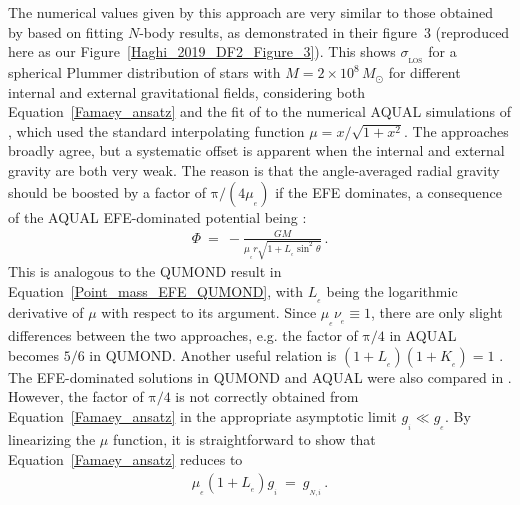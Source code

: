 \documentclass[fleqn,usenatbib,useAMS]{mnras} %
\begin{document}
The numerical values given by this approach are very similar to those obtained by \citet{Haghi_2019_DF2} based on fitting $N$-body results, as demonstrated in their figure~3 (reproduced here as our Figure~\ref{Haghi_2019_DF2_Figure_3}). This shows $\sigma_{_\text{LOS}}$ for a spherical Plummer distribution of stars with $M = 2 \times 10^8 \, M_\odot$ for different internal and external gravitational fields, considering both Equation~\ref{Famaey_ansatz} and the fit of \citet{Haghi_2019_DF2} to the numerical AQUAL simulations of \citet{Haghi_2009}, which used the standard interpolating function $\mu = x/\sqrt{1 + x^2}$. The approaches broadly agree, but a systematic offset is apparent when the internal and external gravity are both very weak. The reason is that the angle-averaged radial gravity should be boosted by a factor of $\mathrm{\pi}/\left( 4 \mu_{_e} \right)$ if the EFE dominates, a consequence of the AQUAL EFE-dominated potential being \citep{Milgrom_1986}:
\begin{eqnarray}
	\label{Point_mass_EFE_AQUAL}
	\Phi ~=~ -\frac{GM}{\mu_{_e}r\sqrt{1 + L_{_e} \sin^2 \theta}} \, .
\end{eqnarray}
This is analogous to the QUMOND result in Equation~\ref{Point_mass_EFE_QUMOND}, with $L_{_e}$ being the logarithmic derivative of $\mu$ with respect to its argument. Since $\mu_{_e} \nu_{_e} \equiv 1$, there are only slight differences between the two approaches, e.g. the factor of $\mathrm{\pi}/{4}$ in AQUAL becomes $5/6$ in QUMOND. Another useful relation is $\left( 1 + L_{_e} \right) \left( 1 + K_{_e} \right) = 1$ \citep[equation~38 of][]{Banik_2018_Centauri}. The EFE-dominated solutions in QUMOND and AQUAL were also compared in \citet{QUMOND}. However, the factor of $\mathrm{\pi}/4$ is not correctly obtained from Equation~\ref{Famaey_ansatz} in the appropriate asymptotic limit $g_{_i} \ll g_{_e}$. By linearizing the $\mu$ function, it is straightforward to show that Equation~\ref{Famaey_ansatz} reduces to
\begin{eqnarray}
	\mu_{_e} \left( 1 + L_{_e} \right) g_{_i} ~=~ g_{_{N,i}} \, .
\end{eqnarray}
\end{document}
